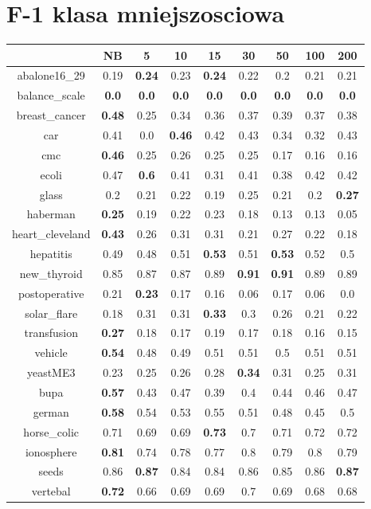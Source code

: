 \documentclass{article}%
\begin{document}
%
\section*{F{-}1 klasa mniejszosciowa}%
\begin{tabular}{c|cccccccc}%
\hline%
&NB&5&10&15&30&50&100&200\\%
\hline%
abalone16\_29&0.19&\textbf{0.24}&0.23&\textbf{0.24}&0.22&0.2&0.21&0.21\\%
\hline%
balance\_scale&\textbf{0.0}&\textbf{0.0}&\textbf{0.0}&\textbf{0.0}&\textbf{0.0}&\textbf{0.0}&\textbf{0.0}&\textbf{0.0}\\%
\hline%
breast\_cancer&\textbf{0.48}&0.25&0.34&0.36&0.37&0.39&0.37&0.38\\%
\hline%
car&0.41&0.0&\textbf{0.46}&0.42&0.43&0.34&0.32&0.43\\%
\hline%
cmc&\textbf{0.46}&0.25&0.26&0.25&0.25&0.17&0.16&0.16\\%
\hline%
ecoli&0.47&\textbf{0.6}&0.41&0.31&0.41&0.38&0.42&0.42\\%
\hline%
glass&0.2&0.21&0.22&0.19&0.25&0.21&0.2&\textbf{0.27}\\%
\hline%
haberman&\textbf{0.25}&0.19&0.22&0.23&0.18&0.13&0.13&0.05\\%
\hline%
heart\_cleveland&\textbf{0.43}&0.26&0.31&0.31&0.21&0.27&0.22&0.18\\%
\hline%
hepatitis&0.49&0.48&0.51&\textbf{0.53}&0.51&\textbf{0.53}&0.52&0.5\\%
\hline%
new\_thyroid&0.85&0.87&0.87&0.89&\textbf{0.91}&\textbf{0.91}&0.89&0.89\\%
\hline%
postoperative&0.21&\textbf{0.23}&0.17&0.16&0.06&0.17&0.06&0.0\\%
\hline%
solar\_flare&0.18&0.31&0.31&\textbf{0.33}&0.3&0.26&0.21&0.22\\%
\hline%
transfusion&\textbf{0.27}&0.18&0.17&0.19&0.17&0.18&0.16&0.15\\%
\hline%
vehicle&\textbf{0.54}&0.48&0.49&0.51&0.51&0.5&0.51&0.51\\%
\hline%
yeastME3&0.23&0.25&0.26&0.28&\textbf{0.34}&0.31&0.25&0.31\\%
\hline%
bupa&\textbf{0.57}&0.43&0.47&0.39&0.4&0.44&0.46&0.47\\%
\hline%
german&\textbf{0.58}&0.54&0.53&0.55&0.51&0.48&0.45&0.5\\%
\hline%
horse\_colic&0.71&0.69&0.69&\textbf{0.73}&0.7&0.71&0.72&0.72\\%
\hline%
ionosphere&\textbf{0.81}&0.74&0.78&0.77&0.8&0.79&0.8&0.79\\%
\hline%
seeds&0.86&\textbf{0.87}&0.84&0.84&0.86&0.85&0.86&\textbf{0.87}\\%
\hline%
vertebal&\textbf{0.72}&0.66&0.69&0.69&0.7&0.69&0.68&0.68\\%
\hline%
\end{tabular}
\end{document}
